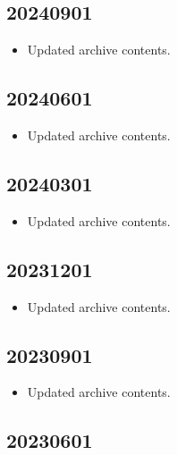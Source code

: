 \documentclass[hidelinks,a4paper,12pt]{article}
\begin{document}
\subsection{20240901}  \label{sec:changelog_20240901}

\begin{itemize}
\item Updated archive contents.
\end{itemize}

\subsection{20240601}  \label{sec:changelog_20240601}

\begin{itemize}
\item Updated archive contents.
\end{itemize}

\subsection{20240301}  \label{sec:changelog_20240301}

\begin{itemize}
\item Updated archive contents.
\end{itemize}

\subsection{20231201}  \label{sec:changelog_20231201}

\begin{itemize}
\item Updated archive contents.
\end{itemize}

\subsection{20230901}  \label{sec:changelog_20230901}

\begin{itemize}
\item Updated archive contents.
\end{itemize}

\subsection{20230601}  \label{sec:changelog_20230601}
\end{document}
